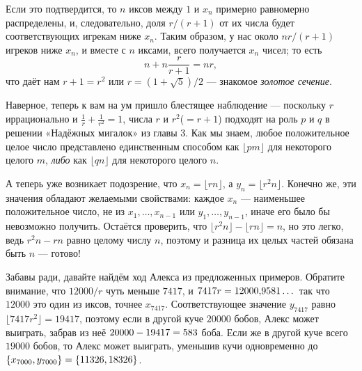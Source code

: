 Если это подтвердится, то $n$ иксов между $1$ и $x_n$ примерно равномерно распределены, и, следовательно, доля $r/(r + 1)$ от их числа будет соответствующих игрекам ниже $x_n$.
Таким образом, у нас около $nr/(r + 1)$ игреков ниже $x_n$, и вместе с $n$ иксами, всего получается $x_n$ чисел; то есть
\[n+n\frac{r}{r+1}=nr,\]
что даёт нам $r + 1 = r^2$ или $r = (1 + \sqrt{5})/2$ --- знакомое \emph{золотое сечение}.

Наверное, теперь к вам на ум пришло блестящее наблюдение --- поскольку $r$ иррационально и $\tfrac1r+\tfrac1{r^2}=1$, числа $r$ и $r^2$($= r + 1$) подходят на роль $p$ и $q$ в решении «Надёжных мигалок» из главы 3.
Как мы знаем, любое положительное целое число представлено единственным способом как $\lfloor pm\rfloor$ для некоторого целого $m$, \emph{либо} как $\lfloor qn\rfloor$ для некоторого целого $n$.

А теперь уже возникает подозрение, что $x_n=\lfloor rn\rfloor$, а $y_n=\lfloor r^2 n\rfloor$.
Конечно же, эти значения обладают желаемыми свойствами:
каждое $x_n$ --- наименьшее положительное число, не из $x_1, \dots , x_{n-1}$ или $y_1, \dots, y_{n-1}$, иначе его было бы невозможно получить.
Остаётся проверить, что $\lfloor r^2 n\rfloor - \lfloor rn\rfloor = n$, но это легко, ведь $r^2 n - rn$ равно целому числу $n$,
поэтому и разница их целых частей обязана быть $n$ --- готово!

Забавы ради, давайте найдём ход Алекса из предложенных примеров.
Обратите внимание, что $12 000/r$ чуть меньше $7417$, и $7417r \z= 12 000{,}9581\dots$ так что $12 000$ это один из иксов, точнее $x_{7417}$.
Соответствующее значение $y_{7417}$ равно $\lfloor 7417r^2\rfloor = 19 417$, поэтому если в другой куче $20 000$ бобов, Алекс может выиграть, забрав из неё $20 000 \z- 19 417 = 583$ боба.
Если же в другой куче всего $19 000$ бобов, то Алекс может выиграть, уменьшив кучи одновременно до $\{x_{7000}, y_{7000}\} \z= \{11 326, 18 326\}$.


